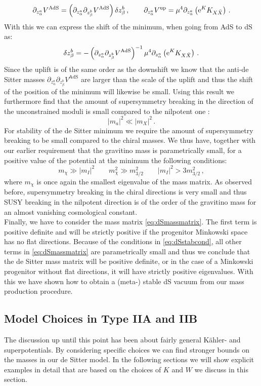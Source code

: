 \documentclass[a4paper,12pt,twoside,openright]{report}
\newcommand{\be}{\begin{equation}}
\newcommand{\ee}{\end{equation}}
\def\rme{{\rm e}}
\begin{document}
\be 
\partial_{z^a_{\alpha}} V^{\text{AdS}}=\left(\partial_{z^a_\alpha } \partial_{z^b_\beta} V^{\text{AdS}} \right) \delta z^b_\beta\,, \qquad \partial_{z^a_{\alpha}} V^{\text{up}} = \mu^4 \partial_{z^a_\alpha} \left(\rme^K K_{X\bar{X}}\right)\,.
\ee
With this we can express the shift of the minimum, when going from AdS to dS as:
\be 
\delta z^b_\beta = -\left( \partial_{z_\alpha^a}\partial_{z^b_\beta} V^{\text{AdS}}\right)^{-1} \mu^4 \partial_{z^a_\alpha} \left(\rme^K K_{X\bar{X}}\right)\,.
\ee
Since the uplift is of the same order as the downshift we know that the anti-de Sitter masses $\partial_{z_\alpha^a}\partial_{z^b_\beta} V^{\text{AdS}}$ are larger than the scale of the uplift and thus the shift of the position of the minimum will likewise be small. Using this result we furthermore find that the amount of supersymmetry breaking in the direction of the unconstrained moduli is small compared to the nilpotent one \cite{Linde:2011ja}:
\be 
|m_a|^2 \ll |m_X|^2\,.
\ee
For stability of the de Sitter minimum we require the amount of supersymmetry breaking to be small compared to the chiral masses. We thus have, together with our earlier requirement that the gravitino mass is parametrically small, for a positive value of the potential at the minimum the following conditions:
\be 
m_\chi \gg |m_I|^2\qquad m_\chi^2 \gg m^2_{3/2} \qquad |m_I|^2 > 3 m_{3/2}^2\,,
\label{eq:dSstabcond}
\ee
where $m_\chi$ is once again the smallest eigenvalue of the mass matrix. As observed before, supersymmetry breaking in the chiral directions is very small and thus SUSY breaking in the nilpotent direction is of the order of the gravitino mass for an almost vanishing cosmological constant.\\
Finally, we have to consider the mass matrix \eqref{eq:dSmassmatrix}. The first term is positive definite and will be strictly positive if the progenitor Minkowski space has no flat directions. Because of the conditions in \eqref{eq:dSstabcond}, all other terms in \eqref{eq:dSmassmatrix} are parametrically small and thus we conclude that the de Sitter mass matrix will be positive definite, or in the case of a Minkowski progenitor without flat directions, it will have strictly  positive eigenvalues. With this we have shown how to obtain a (meta-) stable dS vacuum from our mass production procedure.

\subsection{Model Choices in Type IIA and IIB}
The discussion up until this point has been about fairly general Kähler- and superpotentials. By considering specific choices we can find stronger bounds on the masses in our de Sitter model. In the following sections we will show explicit examples in detail that are based on the choices of $K$ and $W$ we discuss in this section. 
\end{document}
